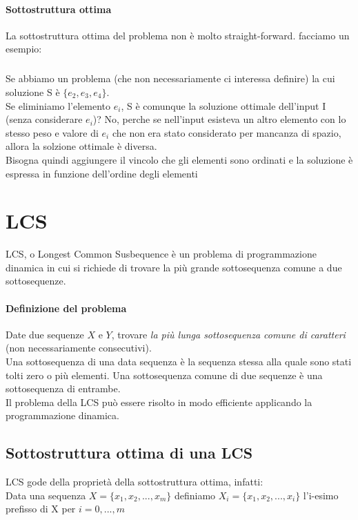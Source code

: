 \documentclass[12pt, a4paper, openany]{book}
\begin{document}
\paragraph{Sottostruttura ottima}
La sottostruttura ottima del problema non è molto straight-forward. facciamo un esempio:
\subparagraph*{}Se abbiamo un problema (che non necessariamente ci interessa definire) la cui soluzione S è $\{e_2,e_3,e_4\}$.\\
Se eliminiamo l'elemento $e_i$, S è comunque la soluzione ottimale dell'input I (senza considerare $e_i$)? No, perche se nell'input esisteva un altro elemento con lo stesso peso e valore di $e_i$ che non era stato considerato per mancanza di spazio, allora la solzione ottimale è diversa.
\\Bisogna quindi aggiungere il vincolo che gli elementi sono ordinati e la soluzione è espressa in funzione dell'ordine degli elementi

\section{LCS}
LCS, o Longest Common Susbequence è un problema di programmazione dinamica in cui si richiede di trovare la più grande sottosequenza comune a due sottosequenze.

\paragraph{Definizione del problema}
Date due sequenze $X$ e $Y$, trovare \emph{la più lunga sottosequenza comune di caratteri} (non necessariamente consecutivi).\\
Una sottosequenza di una data sequenza è la sequenza stessa alla quale sono stati tolti zero o più elementi.
Una sottosequenza comune di due sequenze è una sottosequenza di entrambe.
\\Il problema della LCS può essere risolto in modo efficiente applicando la programmazione dinamica.

\subsection*{Sottostruttura ottima di una LCS}
LCS gode della proprietà della sottostruttura ottima, infatti:
\\Data una sequenza $X=\{x_1,x_2,...,x_m\}$ definiamo $X_i=\{x_1,x_2,...,x_i\}$ l'i-esimo prefisso di X per $i = 0,...,m$
\end{document}
